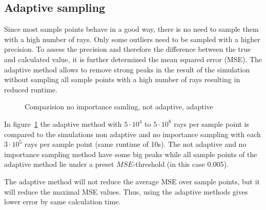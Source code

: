 \subsection{Adaptive sampling}
\label{subsec:adaptive_sampling}
Since most sample points behave in a good way, there is no need
to sample them with a high number of rays. Only some outliers need to
be sampled with a higher precision. To assess the precision
and therefore the difference between the true and calculated value,
it is further determined the mean squared error (MSE).
The adaptive method allows to remove strong peaks in the result
of the simulation without sampling all sample points with
a high number of rays resulting in reduced runtime.
\begin{figure}
  \centerline{
    }
  \caption{Comparision no importance samling, not adaptive, adaptive}
  \label{plot:adaptive}
\end{figure}

In figure~\ref{plot:adaptive} the adaptive method with 
$5 \cdot 10^4$ to $5 \cdot 10^8$ rays per sample point is compared to the simulations
non adaptive and no importance sampling with each $3 \cdot 10^5$ rays per sample point (same runtime of 10s).
The not adaptive and no importance sampling method have some big peaks while all sample points of 
the adaptive method lie under a preset $MSE$-threshold (in this case 0.005). 

The adaptive method will not reduce the average MSE over sample points,
but it will reduce the maximal MSE values. Thus, using the adaptive
methods gives lower error by same calculation time.


